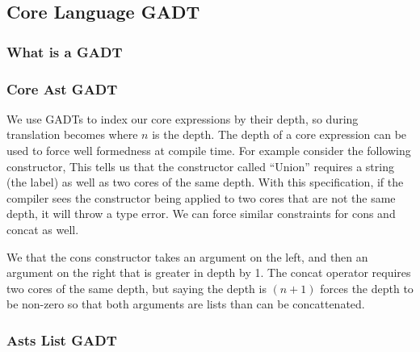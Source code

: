 \subsection{Core Language GADT}
\subsubsection{What is a GADT}

\subsubsection{Core Ast GADT}
\par We use GADTs to index our core expressions by their depth, 
so during translation  becomes  where $n$ is the depth. 
The depth of a core expression can be used to force well formedness at compile time. 
For example consider the following constructor, 
This tells us that the constructor called ``Union'' requires a string (the label) as well as two cores of the same depth.
With this specification, if the compiler sees the constructor being applied to two cores that are not the same depth, it will
throw a type error. We can force similar constraints for cons and concat as well.


We that the cons constructor takes an argument on the left, and then an argument on the right that is greater in depth by 1.
The concat operator requires two cores of the same depth, 
but saying the depth is $(n + 1)$ forces the depth to be non-zero so that both arguments are lists than can be concattenated.

\subsubsection{Asts List GADT}
